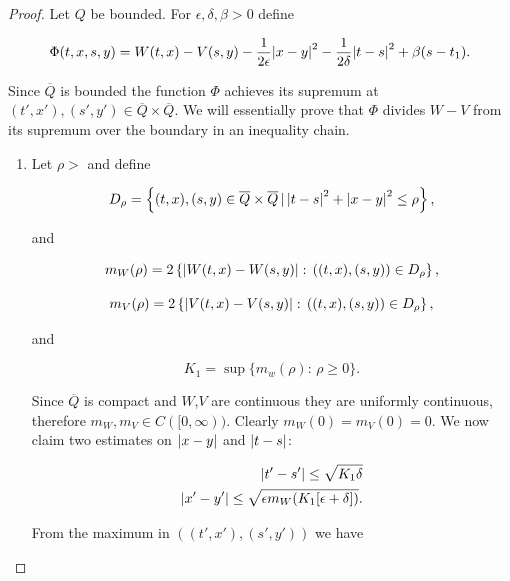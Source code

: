 \begin{proof}
    
    Let $Q$ be bounded. For $\epsilon, \delta, \beta >0$ define
    
    \begin{equation*}\label{4-2-InProofSup:phi}
        \Phi(t,x,s,y) = W(t,x) - V(s,y) - \frac{1}{2\epsilon} \abs{x-y}^2 -\frac{1}{2\delta} \abs{t-s}^2 + \beta(s-t_1).   
    \end{equation*}

    Since $\overline{Q}$ is bounded the function $\Phi$ achieves its supremum at $(t',x'),(s',y')\in\overline{Q}\times\overline{Q}$. We will essentially prove 
    that $\Phi$ divides $W-V$ from its supremum over the boundary in an inequality chain.
    
    \begin{enumerate}
        \item Let $\rho>$ and define
        
        \begin{equation*}\label{4-2-InProofSup:Drho}
            D_{\rho} = \left\{(t,x),(s,y)\in\overline{Q}\times\overline{Q}\,|\,\abs{t-s}^2+\abs{x-y}^2\leq\rho\right\},
        \end{equation*}

        and 

        \[m_W(\rho)=2\left\{\abs{W(t,x)-W(s,y)}:\,((t,x),(s,y))\in D_{\rho}\right\},\]

        \[m_V(\rho)=2\left\{\abs{V(t,x)-V(s,y)}:\,((t,x),(s,y))\in D_{\rho}\right\},\]

        and 

        \[K_1 = \sup\{m_w(\rho):\,\rho\geq0\}.\]

        Since $\overline{Q}$ is compact and $W$,$V$ are continuous they are uniformly continuous, therefore $m_W,m_V\in C([0,\infty))$. Clearly 
        $m_W(0)=m_V(0)=0$. We now claim two estimates on $\abs{x-y}$ and $\abs{t-s}$:

        \begin{equation*}
            \begin{aligned}
                \abs{t'-s'}\leq\sqrt{K_1\delta} \\
                \abs{x'-y'}\leq \sqrt{\epsilon m_W(K_1[\epsilon+\delta])}.
            \end{aligned}
        \end{equation*}

        From the maximum in $((t',x'),(s',y'))$ we have


\end{enumerate}
\end{proof}
